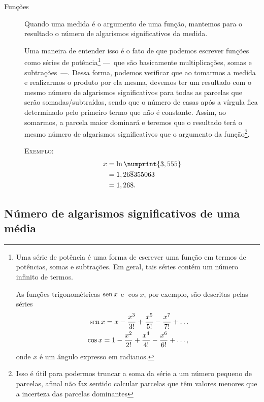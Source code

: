 \begin{description}
\item[Funções] Quando uma medida é o argumento de uma função, mantemos para o resultado o número de algarismos significativos da medida. 

Uma maneira de entender isso é o fato de que podemos escrever funções como séries de potência\footnote[][-4cm]{Uma série de potência é uma forma de escrever uma função em termos de potências, somas e subtrações. Em geral, tais séries contém um número infinito de termos.

As funções trigonométricas $\operatorname{sen} x$ e $\cos x$, por exemplo, são descritas pelas séries
\begin{align*}
	\operatorname{sen} x = x - \frac{x^3}{3!} + \frac{x^5}{5!} - \frac{x^7}{7!} + \dots \\
	\cos x = 1 - \frac{x^2}{2!} + \frac{x^4}{4!} - \frac{x^6}{6!} + \dots,
\end{align*}
%
onde $x$ é um ângulo expresso em radianos.
} ---~que são basicamente multiplicações, somas e subtrações~---. Dessa forma, podemos verificar que ao tomarmos a medida e realizarmos o produto por ela mesma, devemos ter um resultado com o mesmo número de algarismos significativos para todas as parcelas que serão somadas/subtraídas, sendo que o número de casas após a vírgula fica determinado pelo primeiro termo que não é constante. Assim, ao somarmos, a parcela maior dominará e teremos que o resultado terá o mesmo número de algarismos significativos que o argumento da função\footnote{Isso é útil para podermos truncar a soma da série a um número pequeno de parcelas, afinal não faz sentido calcular parcelas que têm valores menores que a incerteza das parcelas dominantes}.

\textsc{Exemplo:}
\begin{align}
	x &= \ln \numprint{3,555} \\
	&= 1,26\overline{8}355063 \\
	&= 1,268.
\end{align}
\end{description}

\subsection{Número de algarismos significativos de uma média}

